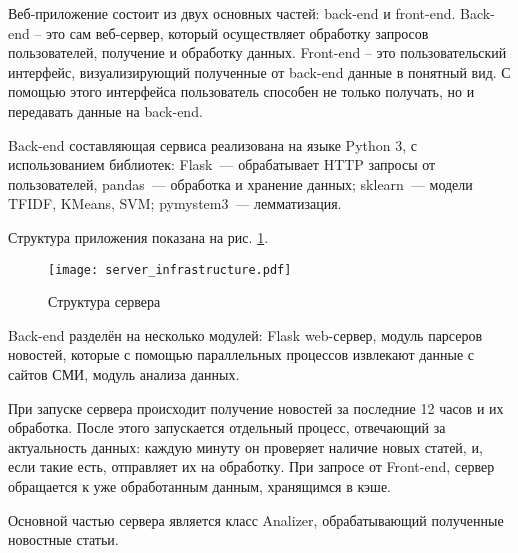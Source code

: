 Веб-приложение состоит из двух основных частей: back-end и front-end. Back-end -- это сам веб-сервер,
который осуществляет обработку запросов пользователей, получение и обработку данных.
Front-end -- это пользовательский интерфейс, визуализирующий полученные от back-end данные в понятный вид.
С помощью этого интерфейса пользователь способен не только получать, но и передавать данные на back-end.

Back-end составляющая сервиса реализована на языке Python 3, с использованием библиотек: Flask~---
обрабатывает HTTP запросы от пользователей, pandas~--- обработка и хранение данных; sklearn~--- модели TFIDF, KMeans, SVM;
pymystem3~--- лемматизация.

Структура приложения показана на рис. \ref{server_struct}.

\begin{figure}[h]
    \centering
    \texttt{[image: server\_infrastructure.pdf]}
    \caption{Структура сервера}
    \label{server_struct}
\end{figure}

Back-end разделён на несколько модулей: Flask web-сервер, модуль парсеров новостей, которые
с помощью параллельных процессов извлекают данные с сайтов СМИ, модуль анализа данных.

При запуске сервера происходит получение новостей за последние 12 часов и их обработка.
После этого запускается отдельный процесс, отвечающий за актуальность данных: каждую минуту он
проверяет наличие новых статей, и, если такие есть, отправляет их на обработку. При запросе от Front-end, сервер
обращается к уже обработанным данным, хранящимся в кэше.

Основной частью сервера является класс Analizer, обрабатывающий полученные
новостные статьи.

